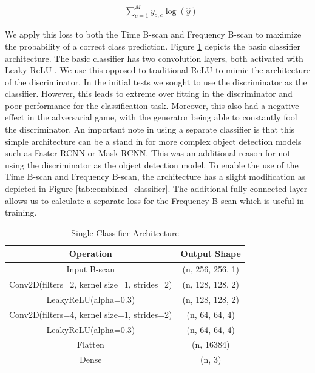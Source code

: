 \begin{center}
    \begin{align}
    \label{eq:cross-entropy}
        -\sum_{c=1}^My_{o,c}\log({\hat{y}})
    \end{align}
\end{center}

We apply this loss to both the Time B-scan and Frequency B-scan to maximize the probability of a correct class prediction. Figure \ref{tab:single_classifier} depicts the basic classifier architecture. The basic classifier has two convolution layers, both activated with Leaky ReLU \cite{leaky_relu}. We use this opposed to traditional ReLU to mimic the architecture of the discriminator. In the initial tests we sought to use the discriminator as the classifier. However, this leads to extreme over fitting in the discriminator and poor performance for the classification task. Moreover, this also had a negative effect in the adversarial game, with the generator being able to constantly fool the discriminator. An important note in using a separate classifier is that this simple architecture can be a stand in for more complex object detection models such as Faster-RCNN\cite{Faster-RCNN} or Mask-RCNN\cite{Mask-RCNN}. This was an additional reason for not using the discriminator as the object detection model. To enable the use of the Time B-scan and Frequency B-scan, the architecture has a slight modification as depicted in Figure \ref{tab:combined_classifier}. The additional fully connected layer allows us to calculate a separate loss for the Frequency B-scan which is useful in training. 


\begin{center}
    \begin{table}[H]
        \centering
        \begin{tabular}{c|c}
            Operation & Output Shape \\
            \hline
            Input B-scan & (n, 256, 256, 1) \\
            Conv2D(filters=2, kernel size=1, strides=2) & (n, 128, 128, 2)\\
            LeakyReLU(alpha=0.3) & (n, 128, 128, 2) \\
            Conv2D(filters=4, kernel size=1, strides=2) & (n, 64, 64, 4)\\
            LeakyReLU(alpha=0.3) & (n, 64, 64, 4)\\
            Flatten & (n, 16384) \\
            Dense & (n, 3) \\
        \end{tabular}
        \caption{Single Classifier Architecture}
        \label{tab:single_classifier}
    \end{table}
\end{center}

